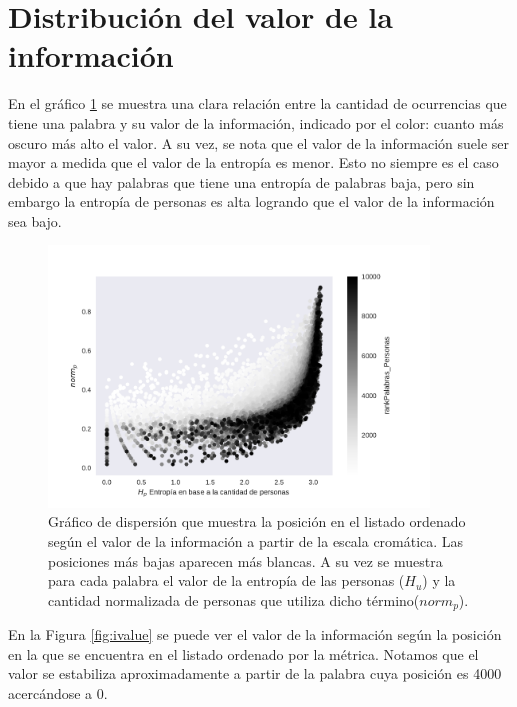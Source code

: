 \section{Distribución del valor de la información}
\label{sec:ValorDeLaInformacion}
En el gráfico \ref{fig:infoValue} se muestra una clara relación entre la cantidad de ocurrencias que tiene una palabra y su valor de la información, indicado por el color: cuanto más oscuro más alto el valor. A su vez, se nota que el valor de la información suele ser mayor a medida que el valor de la entropía es menor. Esto no siempre es el caso debido a que hay palabras que tiene una entropía de palabras baja, pero sin embargo la entropía de personas es alta logrando que el valor de la información sea bajo.

\begin{figure}[h]
\centering
\includegraphics[width=0.9\textwidth]{./images/entropiaPersonasxNormCantPersonas.pdf}
\caption{Gráfico de dispersión que muestra la posición en el listado ordenado según el valor de la información a partir de la escala cromática. Las posiciones más bajas aparecen más blancas. A su vez se muestra para cada palabra el valor de la entropía de las personas ($H_u$) y la cantidad normalizada de personas que utiliza dicho término($norm_p$). } 
\label{fig:infoValue} 
\end{figure}

En la Figura \ref{fig:ivalue} se puede ver el valor de la información según la posición en la que se encuentra en el listado ordenado por la métrica. Notamos que el valor se estabiliza aproximadamente a partir de la palabra cuya posición es 4000 acercándose a 0.



